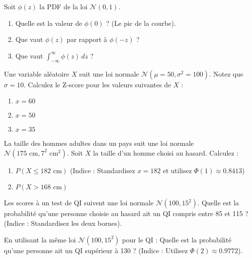 \begin{exercicebox}
Soit $\phi(z)$ la PDF de la loi $\mathcal{N}(0, 1)$.
\begin{enumerate}
    \item Quelle est la valeur de $\phi(0)$ ? (Le pic de la courbe).
    \item Que vaut $\phi(z)$ par rapport à $\phi(-z)$ ?
    \item Que vaut $\int_{-\infty}^{\infty} \phi(z) \, dz$ ?
\end{enumerate}
\end{exercicebox}


\begin{exercicebox}
Une variable aléatoire $X$ suit une loi normale $\mathcal{N}(\mu=50, \sigma^2=100)$. Notez que $\sigma=10$.
Calculez le Z-score pour les valeurs suivantes de $X$ :
\begin{enumerate}
    \item $x = 60$
    \item $x = 50$
    \item $x = 35$
\end{enumerate}
\end{exercicebox}

\begin{exercicebox}
La taille des hommes adultes dans un pays suit une loi normale $\mathcal{N}(175 \text{ cm}, 7^2 \text{ cm}^2)$.
Soit $X$ la taille d'un homme choisi au hasard. Calculez :
\begin{enumerate}
    \item $P(X \le 182 \text{ cm})$ (Indice : Standardisez $x=182$ et utilisez $\Phi(1) \approx 0.8413$)
    \item $P(X > 168 \text{ cm})$
\end{enumerate}
\end{exercicebox}

\begin{exercicebox}
Les scores à un test de QI suivent une loi normale $\mathcal{N}(100, 15^2)$.
Quelle est la probabilité qu'une personne choisie au hasard ait un QI compris entre 85 et 115 ?
(Indice : Standardisez les deux bornes).
\end{exercicebox}

\begin{exercicebox}
En utilisant la même loi $\mathcal{N}(100, 15^2)$ pour le QI :
Quelle est la probabilité qu'une personne ait un QI supérieur à 130 ?
(Indice : Utilisez $\Phi(2) \approx 0.9772$).
\end{exercicebox}

